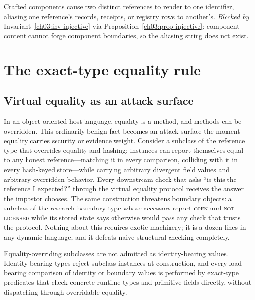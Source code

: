 \begin{threat}\label{ch03:threat-collision}
Crafted components cause two distinct references to render to one
identifier, aliasing one reference's records, receipts, or
registry rows to another's. \emph{Blocked by}
Invariant~\ref{ch03:inv-injective} via
Proposition~\ref{ch03:prop-injective}: component content cannot
forge component boundaries, so the aliasing string does not
exist.
\end{threat}

\section{The exact-type equality rule}\label{ch03:exacttype}

\subsection{Virtual equality as an attack surface}\label{ch03:virtualeq}

In an object-oriented host language, equality is a method, and
methods can be overridden. This ordinarily benign fact becomes an
attack surface the moment equality carries security or evidence
weight. Consider a subclass of the reference type that overrides
equality and hashing: instances can report themselves equal to any
honest reference---matching it in every comparison, colliding with
it in every hash-keyed store---while carrying arbitrary divergent
field values and arbitrary overridden behavior. Every downstream
check that asks ``is this the reference I expected?'' through the
virtual equality protocol receives the answer the impostor chooses.
The same construction threatens boundary objects: a subclass of
the research-boundary type whose accessors report \textsc{open}
and \textsc{not licensed} while its stored state says otherwise
would pass any check that trusts the protocol. Nothing about this
requires exotic machinery; it is a dozen lines in any dynamic
language, and it defeats naive structural checking completely.

\begin{ruleenv}\label{ch03:rule-exacttype}
Equality-overriding subclasses are not admitted as identity-bearing
values. Identity-bearing types reject subclass instances at
construction, and every load-bearing comparison of identity or
boundary values is performed by exact-type predicates that check
concrete runtime types and primitive fields directly, without
dispatching through overridable equality.
\end{ruleenv}

